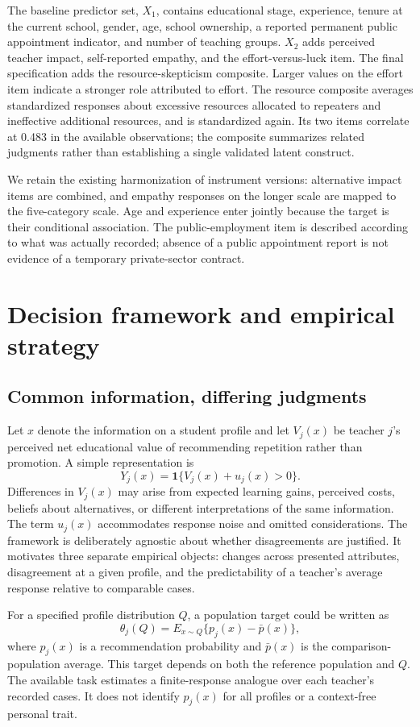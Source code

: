 The baseline predictor set, $X_1$, contains educational stage, experience, tenure at the current school, gender, age, school ownership, a reported permanent public appointment indicator, and number of teaching groups. $X_2$ adds perceived teacher impact, self-reported empathy, and the effort-versus-luck item. The final specification adds the resource-skepticism composite. Larger values on the effort item indicate a stronger role attributed to effort. The resource composite averages standardized responses about excessive resources allocated to repeaters and ineffective additional resources, and is standardized again. Its two items correlate at 0.483 in the available observations; the composite summarizes related judgments rather than establishing a single validated latent construct.

We retain the existing harmonization of instrument versions: alternative impact items are combined, and empathy responses on the longer scale are mapped to the five-category scale. Age and experience enter jointly because the target is their conditional association. The public-employment item is described according to what was actually recorded; absence of a public appointment report is not evidence of a temporary private-sector contract.

\section{Decision framework and empirical strategy}
\begin{addition}
\subsection{Common information, differing judgments}
Let $x$ denote the information on a student profile and let $V_j(x)$ be teacher $j$'s perceived net educational value of recommending repetition rather than promotion. A simple representation is
\[
 Y_j(x)=\mathbf{1}\{V_j(x)+u_j(x)>0\}.
\]
Differences in $V_j(x)$ may arise from expected learning gains, perceived costs, beliefs about alternatives, or different interpretations of the same information. The term $u_j(x)$ accommodates response noise and omitted considerations. The framework is deliberately agnostic about whether disagreements are justified. It motivates three separate empirical objects: changes across presented attributes, disagreement at a given profile, and the predictability of a teacher's average response relative to comparable cases.

For a specified profile distribution $Q$, a population target could be written as
\[
 \theta_j(Q)=E_{x\sim Q}\{p_j(x)-\bar p(x)\},
\]
where $p_j(x)$ is a recommendation probability and $\bar p(x)$ is the comparison-population average. This target depends on both the reference population and $Q$. The available task estimates a finite-response analogue over each teacher's recorded cases. It does not identify $p_j(x)$ for all profiles or a context-free personal trait.
\end{addition}

